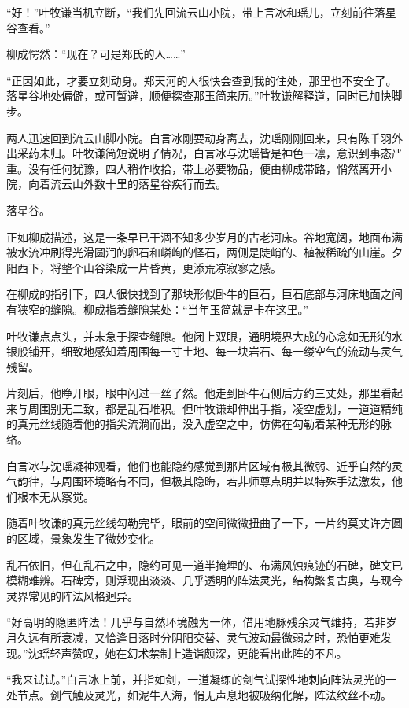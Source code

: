 “好！”叶牧谦当机立断，“我们先回流云山小院，带上言冰和瑶儿，立刻前往落星谷查看。”

柳成愕然：“现在？可是郑氏的人……”

“正因如此，才要立刻动身。郑天河的人很快会查到我的住处，那里也不安全了。落星谷地处偏僻，或可暂避，顺便探查那玉简来历。”叶牧谦解释道，同时已加快脚步。

两人迅速回到流云山脚小院。白言冰刚要动身离去，沈瑶刚刚回来，只有陈千羽外出采药未归。叶牧谦简短说明了情况，白言冰与沈瑶皆是神色一凛，意识到事态严重。没有任何犹豫，四人稍作收拾，带上必要物品，便由柳成带路，悄然离开小院，向着流云山外数十里的落星谷疾行而去。

\vspace{2em}

落星谷。

正如柳成描述，这是一条早已干涸不知多少岁月的古老河床。谷地宽阔，地面布满被水流冲刷得光滑圆润的卵石和嶙峋的怪石，两侧是陡峭的、植被稀疏的山崖。夕阳西下，将整个山谷染成一片昏黄，更添荒凉寂寥之感。

在柳成的指引下，四人很快找到了那块形似卧牛的巨石，巨石底部与河床地面之间有狭窄的缝隙。柳成指着缝隙某处：“当年玉简就是卡在这里。”

叶牧谦点点头，并未急于探查缝隙。他闭上双眼，通明境界大成的心念如无形的水银般铺开，细致地感知着周围每一寸土地、每一块岩石、每一缕空气的流动与灵气残留。

片刻后，他睁开眼，眼中闪过一丝了然。他走到卧牛石侧后方约三丈处，那里看起来与周围别无二致，都是乱石堆积。但叶牧谦却伸出手指，凌空虚划，一道道精纯的真元丝线随着他的指尖流淌而出，没入虚空之中，仿佛在勾勒着某种无形的脉络。

白言冰与沈瑶凝神观看，他们也能隐约感觉到那片区域有极其微弱、近乎自然的灵气韵律，与周围环境略有不同，但极其隐晦，若非师尊点明并以特殊手法激发，他们根本无从察觉。

随着叶牧谦的真元丝线勾勒完毕，眼前的空间微微扭曲了一下，一片约莫丈许方圆的区域，景象发生了微妙变化。

乱石依旧，但在乱石之中，隐约可见一道半掩埋的、布满风蚀痕迹的石碑，碑文已模糊难辨。石碑旁，则浮现出淡淡、几乎透明的阵法灵光，结构繁复古奥，与现今灵界常见的阵法风格迥异。

“好高明的隐匿阵法！几乎与自然环境融为一体，借用地脉残余灵气维持，若非岁月久远有所衰减，又恰逢日落时分阴阳交替、灵气波动最微弱之时，恐怕更难发现。”沈瑶轻声赞叹，她在幻术禁制上造诣颇深，更能看出此阵的不凡。

“我来试试。”白言冰上前，并指如剑，一道凝练的剑气试探性地刺向阵法灵光的一处节点。剑气触及灵光，如泥牛入海，悄无声息地被吸纳化解，阵法纹丝不动。

